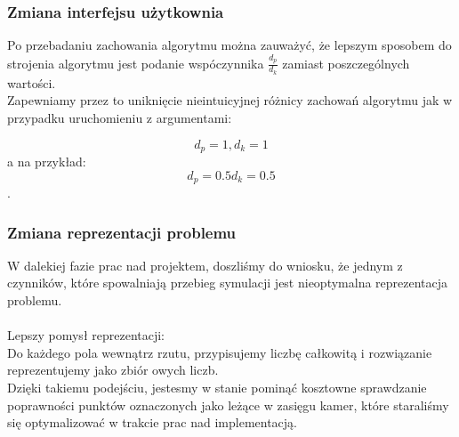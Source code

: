 \documentclass[12pt,a4paper]{article}
\begin{document}
\newpage
\subsubsection{Zmiana interfejsu użytkownia}
Po przebadaniu zachowania algorytmu można zauważyć,
że lepszym sposobem do strojenia algorytmu jest podanie
wspóczynnika $\frac{d_p}{d_k}$ zamiast poszczególnych wartości. \\ 
Zapewniamy przez to uniknięcie nieintuicyjnej różnicy zachowań algorytmu
jak w przypadku uruchomieniu z argumentami:
\begin{center}
\[d_p = 1, d_k = 1\]
a na przykład: \linebreak
\[d_p = 0.5 d_k = 0.5\].
\end{center}

\newpage
\subsubsection{Zmiana reprezentacji problemu}
W dalekiej fazie prac nad projektem, doszliśmy do wniosku,
że jednym z czynników, które spowalniają przebieg symulacji jest nieoptymalna
reprezentacja problemu.\\ \\
Lepszy pomysł reprezentacji: \\
Do każdego pola wewnątrz rzutu, przypisujemy liczbę całkowitą i rozwiązanie
reprezentujemy jako zbiór owych liczb. \\
Dzięki takiemu podejściu, jestesmy w stanie pominąć kosztowne sprawdzanie
poprawności punktów oznaczonych jako leżące w zasięgu kamer,
które staraliśmy się optymalizować w trakcie prac nad implementacją.
\end{document}
